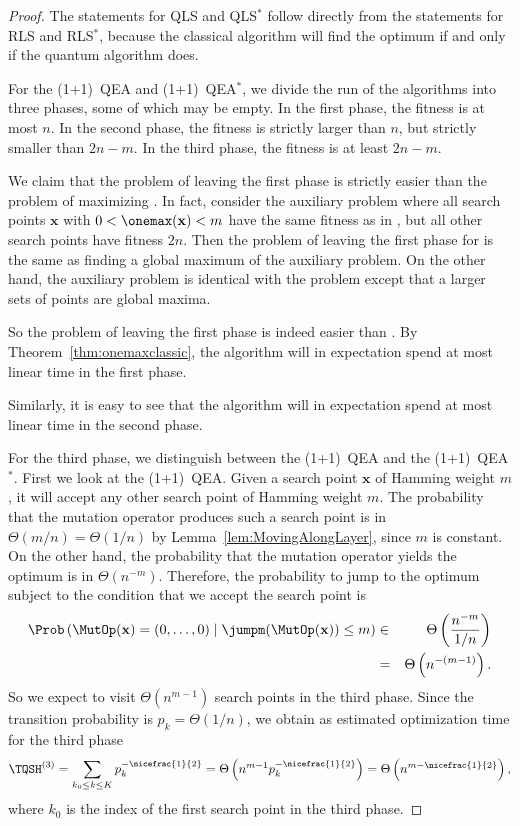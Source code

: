 \begin{proof}
The statements for QLS and QLS$^*$ follow directly from the statements for RLS and RLS$^*$, because the classical algorithm will find the optimum if and only if the quantum algorithm does.

For the (1+1)~QEA and (1+1)~QEA$^*$, we divide the run of the algorithms into three phases, some of which may be empty. In the first phase, the fitness is at most $n$. In the second phase, the fitness is strictly larger than $n$, but strictly smaller than $2n-m$. In the third phase, the fitness is at least $2n-m$. 

We claim that the problem of leaving the first phase is strictly easier than the problem of maximizing \onemax. In fact, consider the auxiliary problem where all search points $\mathbf{x}$ with $0 < \onemax(\mathbf{x}) < m$ have the same fitness as in \jump, but all other search points have fitness $2n$. Then the problem of leaving the first phase for \jump is the same as finding a global maximum of the auxiliary problem. On the other hand, the auxiliary problem is identical with the problem \onemax except that a larger sets of points are global maxima.

So the problem of leaving the first phase is indeed easier than \onemax. By Theorem~\ref{thm:onemaxclassic}, the algorithm will in expectation spend at most linear time in the first phase.

Similarly, it is easy to see that the algorithm will in expectation spend at most linear time in the second phase.


For the third phase, we distinguish between the (1+1)~QEA and the (1+1)~QEA$^*$. First we look at the (1+1)~QEA. Given a search point $\mathbf{x}$ of Hamming weight $m$, it will accept any other search point of Hamming weight $m$. The probability that the mutation operator produces such a search point is in $\Theta(m/n) = \Theta(1/n)$ by Lemma~\ref{lem:MovingAlongLayer}, since $m$ is constant. On the other hand, the probability that the mutation operator yields the optimum is in $\Theta(n^{-m})$. Therefore, the probability to jump to the optimum subject to the condition that we accept the search point is
\begin{eqnarray*}
\Prob\left(\MutOp(\mathbf{x}) = (0,\ldots,0) \mid \jumpm(\MutOp(\mathbf{x})) \leq m \right)
&  \in &
\Theta\left(\frac{n^{-m}}{1/n}\right) \\
&=& \Theta\left(n^{-(m-1)}\right).
\end{eqnarray*}
So we expect to visit $\Theta(n^{m-1})$ search points in the third phase. Since the transition probability is $p_k = \Theta(1/n)$, we obtain as estimated optimization time for the third phase
\[
\TQSH^{(3)}=\sum_{k_0 \le k\le K}p_k^{-\nicefrac{1}{2}} = \Theta\left(n^{m-1}p_k^{-\nicefrac{1}{2}}\right) = \Theta\left(n^{m-\nicefrac{1}{2}}\right) ,
\]
where $k_0$ is the index of the first search point in the third phase.


\end{proof}
